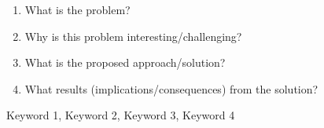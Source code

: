 %


\begin{enumerate}
  \item What is the problem?
  \item Why is this problem interesting/challenging?
  \item What is the proposed approach/solution?
  \item What results (implications/consequences) from the solution?
\end{enumerate}

\begin{keywords}
Keyword 1, Keyword 2, Keyword 3, Keyword 4
\end{keywords} 
